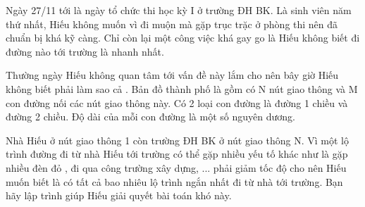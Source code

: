 Ngày 27/11 tới là ngày tổ chức thi học kỳ I ở trường ĐH BK. Là sinh viên năm thứ nhất, Hiếu không muốn vì đi muộn mà gặp trục trặc ở phòng thi nên đã chuẩn bị khá kỹ càng. Chỉ còn lại một công việc khá gay go là Hiếu không biết đi đường nào tới trường là nhanh nhất.  

   Thường ngày Hiếu không quan tâm tới vấn đề này lắm cho nên bây giờ Hiếu không biết phải làm sao cả . Bản đồ thành phố là gồm có N nút giao thông và M con đường nối các nút giao thông này. Có 2 loại con đường là đường 1 chiều và đường 2 chiều. Độ dài của mỗi con đường là một số nguyên dương.  

   Nhà Hiếu ở nút giao thông 1 còn trường ĐH BK ở nút giao thông N. Vì một lộ trình đường đi từ nhà Hiếu tới trường có thể gặp nhiều yếu tố khác như là gặp nhiều đèn đỏ , đi qua công trường xây dựng, ... phải giảm tốc độ cho nên Hiếu muốn biết là có tất cả bao nhiêu lộ trình ngắn nhất đi từ nhà tới trường. Bạn hãy lập trình giúp Hiếu giải quyết bài toán khó này.